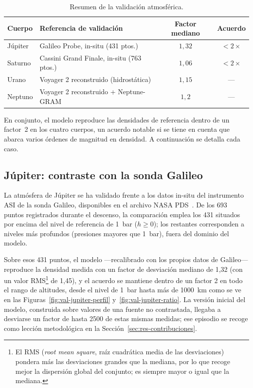 \begin{table}[htbp]
  \centering
  \caption{Resumen de la validación atmosférica.}
  \label{tab:res-factores}
  \begin{tabularx}{\textwidth}{l X c c}
    \hline
    \textbf{Cuerpo} & \textbf{Referencia de validación} & \textbf{Factor mediano} & \textbf{Acuerdo} \\
    \hline
    Júpiter & Galileo Probe, in-situ (431 ptos.)        & $1{,}32$ & $<2\times$ \\
    Saturno & Cassini Grand Finale, in-situ (763 ptos.) & $1{,}06$ & $<2\times$ \\
    Urano   & Voyager 2 reconstruido (hidrostática)     & $1{,}15$ & ---        \\
    Neptuno & Voyager 2 reconstruido + Neptune-\gls{GRAM}     & $1{,}2$  & ---        \\
    \hline
  \end{tabularx}
\end{table}

En conjunto, el modelo reproduce las densidades de referencia dentro de un factor~2 en los cuatro cuerpos, un acuerdo notable si se tiene en cuenta que abarca varios órdenes de magnitud en densidad. A continuación se detalla cada caso.

\subsection{Júpiter: contraste con la sonda Galileo}
\label{sec:res-jupiter}

La atmósfera de Júpiter se ha validado frente a los datos in-situ del instrumento \gls{ASI} de la sonda Galileo, disponibles en el archivo \gls{NASA} \gls{PDS}~\cite{seiff1998,galileoPDS}. De los 693 puntos registrados durante el descenso, la comparación emplea los 431 situados por encima del nivel de referencia de 1~bar ($h\geq 0$); los restantes corresponden a niveles más profundos (presiones mayores que 1~bar), fuera del dominio del modelo.

Sobre esos 431 puntos, el modelo ---recalibrado con los propios datos de Galileo--- reproduce la densidad medida con un factor de desviación mediano de 1,32 (con un valor \gls{RMS}\footnote{El \gls{RMS} (\textit{root mean square}, raíz cuadrática media de las desviaciones) pondera más las desviaciones grandes que la mediana, por lo que recoge mejor la dispersión global del conjunto; es siempre mayor o igual que la mediana.} de 1,45), y el acuerdo se mantiene dentro de un factor 2 en todo el rango de altitudes, desde el nivel de 1~bar hasta más de 1000~km como se ve en las Figuras~\ref{fig:val-jupiter-perfil} y~\ref{fig:val-jupiter-ratio}. La versión inicial del modelo, construida sobre valores de una fuente no contrastada, llegaba a desviarse un factor de hasta 2500 de estas mismas medidas; ese episodio se recoge como lección metodológica en la Sección~\ref{sec:res-contribuciones}.

